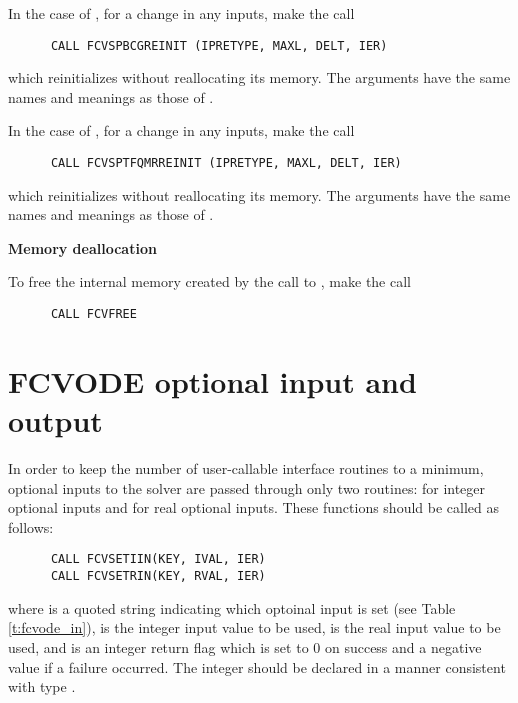 \begin{Steps}
  In the case of {\spbcg}, for a change in any inputs, make the call
\begin{verbatim}
      CALL FCVSPBCGREINIT (IPRETYPE, MAXL, DELT, IER)
\end{verbatim}
  which reinitializes {\spbcg} without reallocating its memory.
  The arguments have the same names and meanings as those of .

  In the case of {\sptfqmr}, for a change in any inputs, make the call
\begin{verbatim}
      CALL FCVSPTFQMRREINIT (IPRETYPE, MAXL, DELT, IER)
\end{verbatim}
  which reinitializes {\sptfqmr} without reallocating its memory.
  The arguments have the same names and meanings as those of .


\item {\bf Memory deallocation}

  To free the internal memory created by the call to ,
  make the call
\begin{verbatim}
      CALL FCVFREE
\end{verbatim}

\end{Steps}


\section{FCVODE optional input and output}\label{fcv_opt_inout}

In order to keep the number of user-callable {\fcvode} interface routines to
a minimum, optional inputs to the {\cvode} solver are passed through only
two routines:  for integer optional inputs and 
for real optional inputs. These functions should be called as follows:
\begin{verbatim}
      CALL FCVSETIIN(KEY, IVAL, IER)
      CALL FCVSETRIN(KEY, RVAL, IER)
\end{verbatim}
where  is a quoted string indicating which optoinal input is set
(see Table \ref{t:fcvode_in}),
 is the integer input value to be used,
 is the real input value to be used, and
 is an integer return flag which is set to $0$ on success and 
a negative value if a failure occurred.
The integer  should be declared in a manner consistent with {\C}
type .

